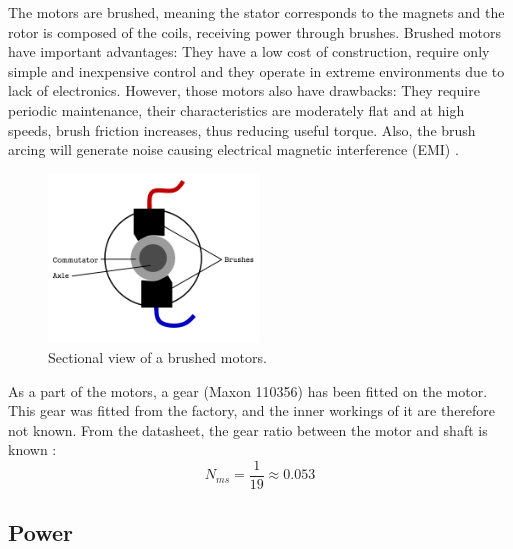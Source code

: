 

The motors are brushed, meaning the stator corresponds to the magnets and the rotor is composed of the coils, receiving power through brushes.
Brushed motors have important advantages: They have a low cost of construction, require only simple and inexpensive control and they operate in extreme environments due to lack of electronics. However, those motors also have drawbacks: They require periodic maintenance, their characteristics are moderately flat and at high speeds, brush friction increases, thus reducing useful torque. Also, the brush arcing will generate noise causing electrical magnetic interference (EMI) \citep{BvsBL} \citep{BvsBLv2}.

\begin{figure}[H]
	\centering
	\includegraphics[width=0.5\textwidth]{figures/brushed_2.png}
	\caption{Sectional view of a brushed motors.}
	\label{DCBrushed}
\end{figure}

As a part of the motors, a gear (Maxon 110356) has been fitted on the motor. This gear was fitted from the factory, and the inner workings of it are therefore not known. From the datasheet, the gear ratio between the motor and shaft is known \citep{gear}: 
$$N_{ms} = \frac{1}{19} \approx 0.053$$

\subsection{Power}
